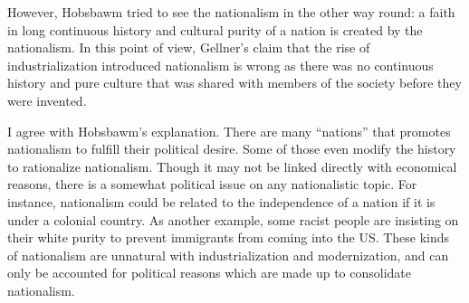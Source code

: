 \documentclass{homework}
\begin{document}
However, Hobsbawm tried to see the nationalism in the other way round: a faith in long continuous history and cultural purity of a nation is created by the nationalism. In this point of view, Gellner's claim that the rise of industrialization introduced nationalism is wrong as there was no continuous history and pure culture that was shared with members of the society before they were invented.

I agree with Hobsbawm's explanation. There are many ``nations'' that promotes nationalism to fulfill their political desire. Some of those even modify the history to rationalize nationalism. Though it may not be linked directly with economical reasons, there is a somewhat political issue on any nationalistic topic. For instance, nationalism could be related to the independence of a nation if it is under a colonial country. As another example, some racist people are insisting on their white purity to prevent immigrants from coming into the US. These kinds of nationalism are unnatural with industrialization and modernization, and can only be accounted for political reasons which are made up to consolidate nationalism. 
\end{document}
